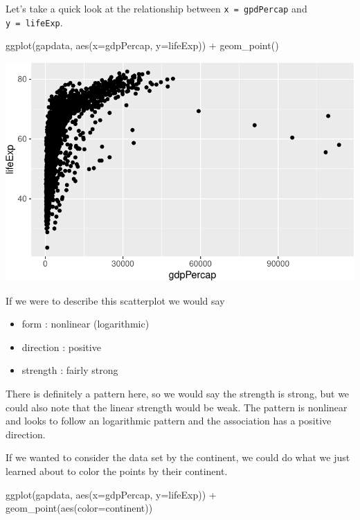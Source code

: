 \documentclass[
  letterpaper,
  DIV=11,
  numbers=noendperiod]{scrreprt}
\newenvironment{Shaded}{\begin{snugshade}}{\end{snugshade}}
\newcommand{\AttributeTok}[1]{\textcolor[rgb]{0.40,0.45,0.13}{#1}}
\newcommand{\FunctionTok}[1]{\textcolor[rgb]{0.28,0.35,0.67}{#1}}
\newcommand{\NormalTok}[1]{\textcolor[rgb]{0.00,0.23,0.31}{#1}}
\newcommand{\SpecialCharTok}[1]{\textcolor[rgb]{0.37,0.37,0.37}{#1}}
\providecommand{\tightlist}{%
  \setlength{\itemsep}{0pt}\setlength{\parskip}{0pt}}\usepackage{longtable,booktabs,array}
\begin{document}
Let's take a quick look at the relationship between
\texttt{x\ =\ gpdPercap} and \texttt{y\ =\ lifeExp}.

\begin{Shaded}
\begin{Highlighting}[]
\FunctionTok{ggplot}\NormalTok{(gapdata, }\FunctionTok{aes}\NormalTok{(}\AttributeTok{x=}\NormalTok{gdpPercap, }\AttributeTok{y=}\NormalTok{lifeExp)) }\SpecialCharTok{+}
  \FunctionTok{geom\_point}\NormalTok{()}
\end{Highlighting}
\end{Shaded}

\includegraphics{Advanced_Scatterplot_Techniques_files/figure-pdf/unnamed-chunk-14-1.pdf}

If we were to describe this scatterplot we would say

\begin{itemize}
\tightlist
\item
  form : nonlinear (logarithmic)
\item
  direction : positive
\item
  strength : fairly strong
\end{itemize}

There is definitely a pattern here, so we would say the strength is
strong, but we could also note that the linear strength would be weak.
The pattern is nonlinear and looks to follow an logarithmic pattern and
the association has a positive direction.

If we wanted to consider the data set by the continent, we could do what
we just learned about to color the points by their continent.

\begin{Shaded}
\begin{Highlighting}[]
  \FunctionTok{ggplot}\NormalTok{(gapdata, }\FunctionTok{aes}\NormalTok{(}\AttributeTok{x=}\NormalTok{gdpPercap, }\AttributeTok{y=}\NormalTok{lifeExp)) }\SpecialCharTok{+}
  \FunctionTok{geom\_point}\NormalTok{(}\FunctionTok{aes}\NormalTok{(}\AttributeTok{color=}\NormalTok{continent))}
\end{Highlighting}
\end{Shaded}
\end{document}
